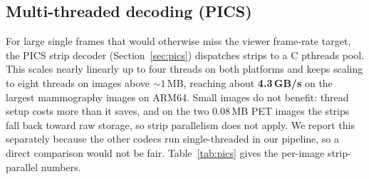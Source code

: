 \documentclass[journal]{IEEEtran}
\begin{document}
\subsection{Multi-threaded decoding (PICS)}
\label{sec:results-pics}

For large single frames that would otherwise miss the viewer frame-rate
target, the PICS strip decoder (Section~\ref{sec:pics}) dispatches strips to
a C pthreads pool. This scales nearly linearly up to four threads on both
platforms and keeps scaling to eight threads on images above ${\sim}1$\,MB,
reaching about \textbf{4.3\,GB/s} on the largest mammography images on
ARM64. Small images do not benefit: thread setup costs more than it saves,
and on the two 0.08\,MB PET images the strips fall back toward raw storage,
so strip parallelism does not apply. We report this separately because the
other codecs run single-threaded in our pipeline, so a direct comparison
would not be fair. Table~\ref{tab:pics} gives the per-image strip-parallel
numbers.
\end{document}

